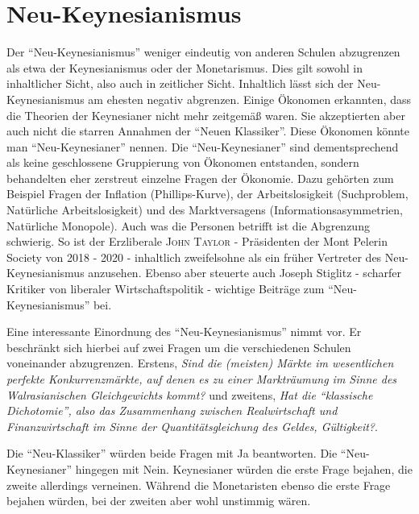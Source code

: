 %
%
%

\chapter{Neu-Keynesianismus} \label{cha: Neu Keynes}

Der "`Neu-Keynesianismus"' weniger eindeutig von anderen Schulen abzugrenzen als etwa der Keynesianismus oder der Monetarismus. Dies gilt sowohl in inhaltlicher Sicht, also auch in zeitlicher Sicht. Inhaltlich lässt sich der Neu-Keynesianismus am ehesten negativ abgrenzen. Einige Ökonomen erkannten, dass die Theorien der Keynesianer nicht mehr zeitgemäß waren. Sie akzeptierten aber auch nicht die starren Annahmen der "`Neuen Klassiker"'. Diese Ökonomen könnte man "`Neu-Keynesianer"' nennen. Die "`Neu-Keynesianer"' sind dementsprechend als keine geschlossene Gruppierung von Ökonomen entstanden, sondern behandelten eher zerstreut einzelne Fragen der Ökonomie. Dazu gehörten zum Beispiel Fragen der Inflation (Phillips-Kurve), der Arbeitslosigkeit (Suchproblem, Natürliche Arbeitslosigkeit) und des Marktversagens (Informationsasymmetrien, Natürliche Monopole). 
Auch was die Personen betrifft ist die Abgrenzung schwierig. So ist der Erzliberale \textsc{John Taylor} - Präsidenten der Mont Pelerin Society von 2018 - 2020 - inhaltlich zweifelsohne als ein früher Vertreter des Neu-Keynesianismus anzusehen. Ebenso aber steuerte auch Joseph Stiglitz - scharfer Kritiker von liberaler Wirtschaftspolitik - wichtige Beiträge zum "`Neu-Keynesianismus"' bei.

Eine interessante Einordnung des "`Neu-Keynesianismus"' nimmt \textcite[S. 21]{RomerDavid1993} vor. Er beschränkt sich hierbei auf zwei Fragen um die verschiedenen Schulen voneinander abzugrenzen. Erstens, \textit{Sind die (meisten) Märkte im wesentlichen perfekte Konkurrenzmärkte, auf denen es zu einer Markträumung im Sinne des Walrasianischen Gleichgewichts kommt?} und zweitens, \textit{Hat die "`klassische Dichotomie"', also das Zusammenhang zwischen Realwirtschaft und Finanzwirtschaft im Sinne der Quantitätsgleichung des Geldes, Gültigkeit?}.

Die "`Neu-Klassiker"' würden beide Fragen mit Ja beantworten. Die "`Neu-Keynesianer"' hingegen mit Nein. Keynesianer würden die erste Frage bejahen, die zweite allerdings verneinen. Während die Monetaristen ebenso die erste Frage bejahen würden, bei der zweiten aber wohl unstimmig wären.

